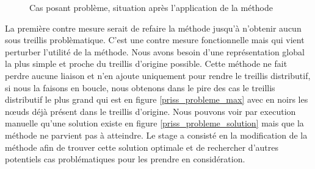 \begin{figure}[H]
	\begin{center}
	\end{center}
	\caption{Cas posant problème, situation après l'application de la méthode}
	\label{priss_probleme_1}
\end{figure}

La première contre mesure serait de refaire la méthode jusqu'à n'obtenir aucun sous treillis problèmatique. C'est une contre mesure fonctionnelle mais qui vient perturber l'utilité de la méthode. Nous avons besoin d'une représentation global la plus simple et proche du treillis d'origine possible. Cette méthode ne fait perdre aucune liaison et n'en ajoute uniquement pour rendre le treillis distributif, si nous la faisons en boucle, nous obtenons dans le pire des cas le treillis distributif le plus grand qui est en figure \ref{priss_probleme_max} avec en noirs les n\oe uds déjà présent dans le treillis d'origine. Nous pouvons voir par execution manuelle qu'une solution existe en figure \ref{priss_probleme_solution} mais que la méthode ne parvient pas à atteindre. Le stage a consisté en la modification de la méthode afin de trouver cette solution optimale et de rechercher d'autres potentiels cas problématiques pour les prendre en considération.

